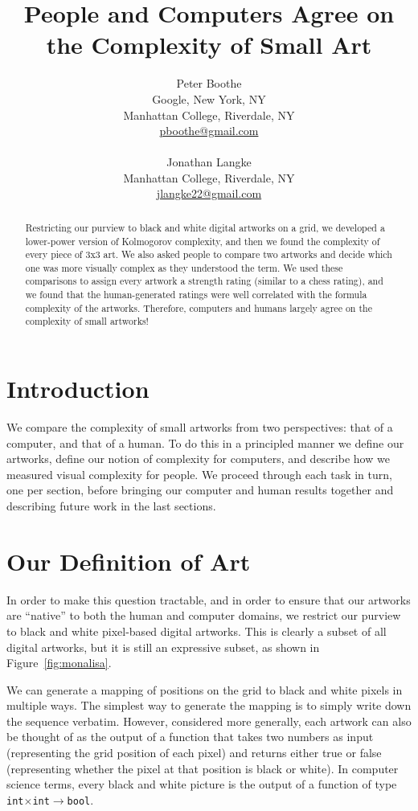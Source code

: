 \documentclass[11pt]{article}
\title{\textbf{People and Computers Agree on the Complexity of Small Art}}
\author{
	Peter Boothe \\
	Google, New York, NY \\
	Manhattan College, Riverdale, NY \\
	\url{pboothe@gmail.com} \\
	\\
	Jonathan Langke \\
	Manhattan College, Riverdale, NY \\
	\url{jlangke22@gmail.com}
}
\date{}
\begin{document}
\maketitle

\thispagestyle{empty}

\begin{abstract}

Restricting our purview to black and white digital artworks on a grid, we
developed a lower-power version of Kolmogorov complexity, and then we found the
complexity of every piece of 3x3 art.  We also asked people to compare two
artworks and decide which one was more visually complex as they understood the
term.  We used these comparisons to assign every artwork a strength rating
(similar to a chess rating), and we found that the human-generated ratings were
well correlated with the formula complexity of the artworks.  Therefore,
computers and humans largely agree on the complexity of small artworks!

\end{abstract}

\section*{Introduction}

We compare the complexity of small artworks from two perspectives: that of a
computer, and that of a human.  To do this in a principled manner we define our
artworks, define our notion of complexity for computers, and describe how we
measured visual complexity for people.  We proceed through each task in turn,
one per section, before bringing our computer and human results
together and describing future work in the last sections.

\section*{Our Definition of Art}

In order to make this question tractable, and in order to ensure that our
artworks are ``native'' to both the human and computer domains, we restrict our
purview to black and white pixel-based digital artworks.  This is clearly a
subset of all digital artworks, but it is still an expressive subset, as shown
in Figure~\ref{fig:monalisa}.  

We can generate a mapping of positions on the grid to black and white pixels in
multiple ways.  The simplest way to generate the mapping is to simply write
down the sequence verbatim.  However, considered more generally, each artwork
can also be thought of as the output of a function that takes two numbers as
input (representing the grid position of each pixel) and returns either true or
false (representing whether the pixel at that position is black or white).  In
computer science terms, every black and white picture is the output of a
function of type {\tt int$\times$int$\to$bool}.  
\end{document}
